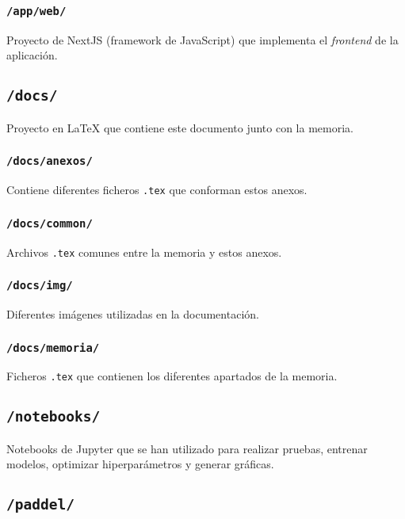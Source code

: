 \subsubsection{\texttt{/app/web/}}

Proyecto de NextJS (framework de JavaScript) que implementa el \textit{frontend}
de la aplicación.

\subsection{\texttt{/docs/}}

Proyecto en \LaTeX{} que contiene este documento junto con la memoria.

\subsubsection{\texttt{/docs/anexos/}}

Contiene diferentes ficheros \texttt{.tex} que conforman estos anexos.

\subsubsection{\texttt{/docs/common/}}

Archivos \texttt{.tex} comunes entre la memoria y estos anexos.

\subsubsection{\texttt{/docs/img/}}

Diferentes imágenes utilizadas en la documentación.

\subsubsection{\texttt{/docs/memoria/}}

Ficheros \texttt{.tex} que contienen los diferentes apartados de la memoria.

\subsection{\texttt{/notebooks/}}

Notebooks de Jupyter que se han utilizado para realizar pruebas, entrenar
modelos, optimizar hiperparámetros y generar gráficas.

\subsection{\texttt{/paddel/}}

